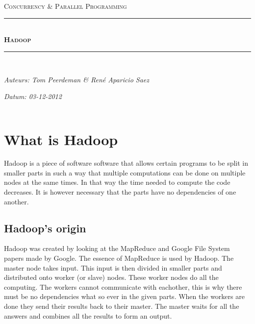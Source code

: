 \documentclass[a4paper]{article}
\newcommand{\HRule}{\rule{\linewidth}{0.5mm}}
\begin{document}
	\begin{titlepage}
	\begin{center}
		\textsc{\Large Concurrency \& Parallel Programming}\\[0.5cm]
		\HRule \\[0,4cm]
		\textsc{\huge \bfseries Hadoop}
		\HRule \\[8cm]
		\begin{minipage}{0.4\textwidth}
			\begin{flushleft}\large
				\emph{Auteurs: Tom Peerdeman \& Ren\'e Aparicio Saez}\\
			\end{flushleft}
		\end{minipage}
		\begin{minipage}{0.4\textwidth}
			\begin{flushright}\large
			\emph{Datum: 03-12-2012\\\hspace{1cm}}\\
			\end{flushright}
		\end{minipage}
	\end{center}
	\end{titlepage}

  \section{What is Hadoop}
    Hadoop is a piece of software software that allows certain programs to
    be split in smaller parts in such a way that multiple computations can
    be done on multiple nodes at the same times. In that way the time needed
    to compute the code decreases. It is however necessary that the parts
    have no dependencies of one another.
    
  \subsection{Hadoop's origin}
    Hadoop was created by looking at the MapReduce and Google File System
    papers made by Google. The essence of MapReduce is used by Hadoop.
    The master node takes input. This input is then divided in smaller parts
    and distributed onto worker (or slave) nodes. These worker nodes do all
    the computing. The workers cannot communicate with eachother,
    this is why there must be no dependencies what so ever in the given parts.
    When the workers are done they send their results back to their
    master. The master waits for all the answers and combines all the results
    to form an output.
    
\end{document}

